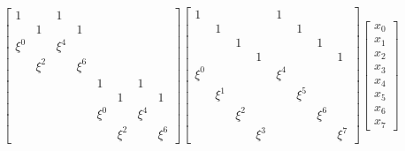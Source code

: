 \documentclass{jsarticle}
\begin{document}
\begin{align*}
\begin{bmatrix}
    1     &       & 1     &       &       &       &       &       \\
          & 1     &       & 1     &       &       &       &       \\
    \xi^0 &       & \xi^4 &       &       &       &       &       \\
          & \xi^2 &       & \xi^6 &       &       &       &       \\
          &       &       &       & 1     &       & 1     &       \\
          &       &       &       &       & 1     &       & 1     \\
          &       &       &       & \xi^0 &       & \xi^4 &       \\
          &       &       &       &       & \xi^2 &       & \xi^6
  \end{bmatrix}
  \begin{bmatrix}
    1     &       &       &       & 1     &       &       &       \\
          & 1     &       &       &       & 1     &       &       \\
          &       & 1     &       &       &       & 1     &       \\
          &       &       & 1     &       &       &       & 1     \\
    \xi^0 &       &       &       & \xi^4 &       &       &       \\
          & \xi^1 &       &       &       & \xi^5 &       &       \\
          &       & \xi^2 &       &       &       & \xi^6 &       \\
          &       &       & \xi^3 &       &       &       & \xi^7
  \end{bmatrix}
  \begin{bmatrix}
    x_0 \\
    x_1 \\
    x_2 \\
    x_3 \\
    x_4 \\
    x_5 \\
    x_6 \\
    x_7
  \end{bmatrix}
  \tag{4}
\end{align*}
\end{document}
